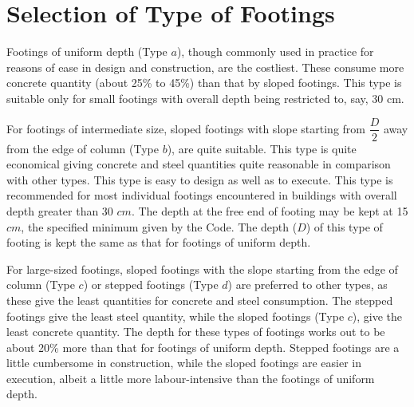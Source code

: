 \section{Selection of Type of Footings}
Footings of uniform depth (Type $a$), though commonly used in practice for reasons of ease in design and construction, are the costliest. These consume more concrete quantity (about 25\% to 45\%) than that by sloped footings. This type is suitable only for small footings with overall depth being restricted to, say, 30 cm.

For footings of intermediate size, sloped footings with slope starting from $\dfrac{D}{2}$ away from the edge of column
(Type $b$), are quite suitable. This type is quite economical giving concrete and steel quantities quite reasonable in comparison with other types. This type is easy to design as well as to execute. This type is recommended for most individual footings encountered in buildings with overall depth greater than 30 $cm$. The depth at the free end of footing may be kept at 15 $cm$, the specified minimum given by the Code. The depth ($D$) of this type of footing is kept the same as that for footings of uniform depth.

For large-sized footings, sloped footings with the slope starting from the edge of column
(Type $c$) or stepped footings (Type $d$) are preferred to other types, as these give the least quantities for concrete and steel consumption. The stepped footings give the least steel quantity, while the sloped footings (Type $c$), give the least concrete quantity. The depth for these types of footings works out to be about 20\% more than that for footings of uniform depth. Stepped footings are a little cumbersome in construction, while the sloped footings are easier in execution, albeit a little more labour-intensive than the footings of uniform depth.


